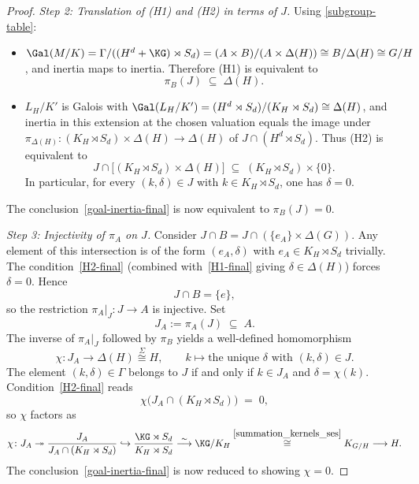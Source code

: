 \begin{proof}
\medskip
\textit{Step 2: Translation of (H1) and (H2) in terms of $J$.}\quad
Using \eqref{subgroup-table}:
\begin{itemize}
  \item $\Gal(M/K) = \Gamma/((H^d + \KG)\rtimes S_d) = (A \times B)/(A \times \Delta(H)) \cong B/\Delta(H) \cong G/H$,
  and inertia maps to inertia. Therefore (H1) is equivalent to
  \begin{equation}\label{eq:H1-final}
  \pi_B(J) \;\subseteq\; \Delta(H).
  \end{equation}
  \item $L_H / K'$ is Galois with
  $\Gal(L_H/K') = (H^d \rtimes S_d)/(K_H \rtimes S_d) \cong \Delta(H)$,
  and inertia in this extension at the chosen valuation equals the image under
  $\pi_{\Delta(H)} : (K_H \rtimes S_d) \times \Delta(H) \to \Delta(H)$ of
  $J \cap (H^d \rtimes S_d)$. Thus (H2) is equivalent to
  \begin{equation}\label{eq:H2-final}
  J \cap \bigl[(K_H \rtimes S_d) \times \Delta(H)\bigr]
   \;\subseteq\; (K_H \rtimes S_d) \times \{0\}.
  \end{equation}
  In particular, for every $(k, \delta) \in J$ with $k \in K_H \rtimes S_d$,
  one has $\delta = 0$.
\end{itemize}
The conclusion~\eqref{goal-inertia-final} is now equivalent to
$\pi_B(J) = 0$.

\medskip
\textit{Step 3: Injectivity of $\pi_A$ on $J$.}\quad
Consider $J \cap B = J \cap (\{e_A\} \times \Delta(G))$. Any element of this
intersection is of the form $(e_A, \delta)$ with $e_A \in K_H \rtimes S_d$
trivially. The condition~\eqref{H2-final} (combined
with~\eqref{H1-final} giving $\delta \in \Delta(H)$) forces $\delta = 0$.
Hence
\begin{equation}\label{eq:J-cap-B-final}
J \cap B = \{e\},
\end{equation}
so the restriction $\pi_A|_J \colon J \to A$ is injective. Set
\[
J_A := \pi_A(J) \;\subseteq\; A.
\]
The inverse of $\pi_A|_J$ followed by $\pi_B$ yields a well-defined
homomorphism
\begin{equation}\label{eq:def-chi}
\chi : J_A \longrightarrow \Delta(H) \overset{\Sigma}{\cong} H,
\qquad k \longmapsto \text{the unique $\delta$ with $(k,\delta) \in J$}.
\end{equation}
The element $(k,\delta) \in \Gamma$ belongs to $J$ if and only if
$k \in J_A$ and $\delta = \chi(k)$. Condition~\eqref{H2-final} reads
\begin{equation}\label{eq:chi-kills-KH}
\chi\bigl(J_A \cap (K_H \rtimes S_d)\bigr) \;=\; 0,
\end{equation}
so $\chi$ factors as
\begin{equation}\label{eq:chi-factor}
\chi \colon J_A \twoheadrightarrow
\frac{J_A}{J_A \cap (K_H \rtimes S_d)}
\hookrightarrow \frac{\KG \rtimes S_d}{K_H \rtimes S_d}
\overset{\sim}{\longrightarrow} \KG/K_H
\overset{\eqref{summation_kernels_ses}}{\cong} K_{G/H}
\longrightarrow H.
\end{equation}
The conclusion~\eqref{goal-inertia-final} is now reduced to showing
$\chi = 0$.


\end{proof}
